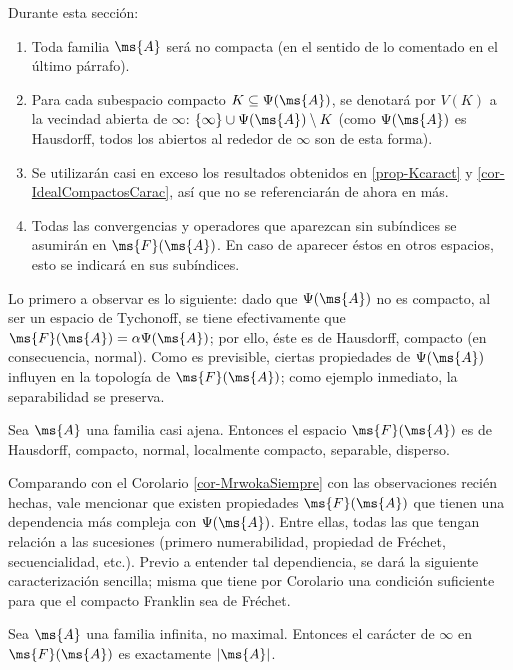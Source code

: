 	\begin{consideracion}
		Durante esta sección:
		\begin{enumerate}
			\item Toda familia $\ms{A}$ será no compacta (en el sentido de lo comentado en el último párrafo).
			\item Para cada subespacio compacto $K \subseteq \Psi(\ms{A})$, se denotará por $V(K)$ a la vecindad abierta de $\infty$: $\{\infty\} \cup \Psi(\ms{A}) \setminus K$ (como $\Psi(\ms{A})$ es Hausdorff, todos los abiertos al rededor de $\infty$ son de esta forma).
			\item Se utilizarán casi en exceso los resultados obtenidos en \ref{prop-Kcaract} y \ref{cor-IdealCompactosCarac}, así que no se referenciarán de ahora en más.
			\item Todas las convergencias y operadores que aparezcan sin subíndices se asumirán en $\ms{F}(\ms{A})$. En caso de aparecer éstos en otros espacios, esto se indicará en sus subíndices.
		\end{enumerate}
	\end{consideracion}

	Lo primero a observar es lo siguiente: dado que $\Psi(\ms{A})$ no es compacto, al ser un espacio de Tychonoff, se tiene efectivamente que $\ms{F}(\ms{A})=\alpha\Psi(\ms{A})$; por ello, éste es de Hausdorff, compacto (en consecuencia, normal). Como es previsible, ciertas propiedades de $\Psi(\ms{A})$ influyen en la topología de $\ms{F}(\ms{A})$; como ejemplo inmediato, la separabilidad se preserva.

	\begin{observacion}
		Sea $\ms{A}$ una familia casi ajena. Entonces el espacio $\ms{F}(\ms{A})$ es de Hausdorff, compacto, normal, localmente compacto, separable, disperso.
	\end{observacion}

	Comparando con el Corolario \ref{cor-MrwokaSiempre} con las observaciones recién hechas, vale mencionar que existen propiedades $\ms{F}(\ms{A})$ que tienen una dependencia más compleja con $\Psi(\ms{A})$. Entre ellas, todas las que tengan relación a las sucesiones (primero numerabilidad, propiedad de Fréchet, secuencialidad, etc.). Previo a entender tal dependiencia, se dará la siguiente caracterización sencilla; misma que tiene por Corolario una condición suficiente para que el compacto Franklin sea de Fréchet.

	\begin{proposicion}
		Sea $\ms{A}$ una familia infinita, no maximal. Entonces el carácter de $\infty$ en $\ms{F}(\ms{A})$ es exactamente $|\ms{A}|$.
	\end{proposicion}
	
